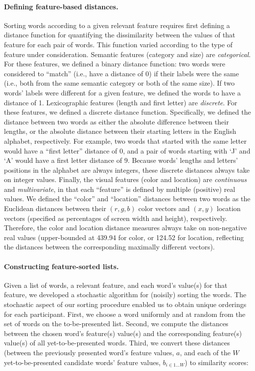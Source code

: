\documentclass[11pt]{article}
\begin{document}
\paragraph{Defining feature-based distances.} Sorting words according to a
given relevant feature requires first defining a distance function for
quantifying the dissimilarity between the values of that feature for each pair
of words. This function varied according to the type of feature under
consideration. Semantic features (category and size) are \textit{categorical}.
For these features, we defined a binary distance function: two words were
considered to ``match'' (i.e., have a distance of 0) if their labels were the
same (i.e., both from the same semantic category or both of the same size). If
two words' labels were different for a given feature, we defined the words to
have a distance of 1. Lexicographic features (length and first letter) are
\textit{discrete}. For these features, we defined a discrete distance function.
Specifically, we defined the distance between two words as either the absolute
difference between their lengths, or the absolute distance between their
starting letters in the English alphabet, respectively. For example, two words
that started with the same letter would have a ``first letter'' distance of 0,
and a pair of words starting with `J' and `A' would have a first letter
distance of 9. Because words' lengths and letters' positions in the alphabet
are always integers, these discrete distances always take on integer values.
Finally, the visual features (color and location) are \textit{continuous} and
\textit{multivariate}, in that each ``feature'' is defined by multiple
(positive) real values. We defined the ``color'' and ``location'' distances
between two words as the Euclidean distances between their $(r, g, b)$ color
vectors and $(x, y)$ location vectors (specified as percentages of screen width
and height), respectively. Therefore, the color and location distance measures
always take on non-negative real values (upper-bounded at 439.94 for color, or
124.52 for location, reflecting the distances between the corresponding
maximally different vectors).

\paragraph{Constructing feature-sorted lists.} Given a list of words, a
relevant feature, and each word's value(s) for that feature, we developed a
stochastic algorithm for (noisily) sorting the words. The stochastic aspect of
our sorting procedure enabled us to obtain unique orderings for each
participant. First, we choose a word uniformly and at random from the set of
words on the to-be-presented list. Second, we compute the distances between the
chosen word's feature(s) value(s) and the corresponding feature(s) value(s) of
all yet-to-be-presented words. Third, we convert these distances (between the
previously presented word's feature values, $a$, and each of the $W$
yet-to-be-presented candidate words' feature values, $b_{i \in 1...W}$) to
similarity scores:
\end{document}

